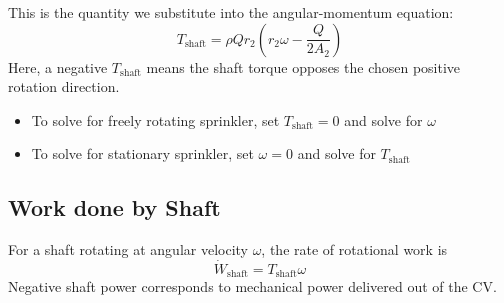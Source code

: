 ﻿\documentclass[12pt]{article}
\begin{document}
\begin{examplebox}
This is the quantity we substitute into the angular-momentum equation:
\[
\boxed{T_{\mathrm{shaft}}=\rho Qr_2\left(r_2\omega-\frac{Q}{2A_2}\right)}
\]
Here, a negative \(T_{\mathrm{shaft}}\) means the shaft torque opposes the chosen positive rotation direction.
\begin{itemize}
    \item To solve for freely rotating sprinkler, set \(T_{\mathrm{shaft}}=0\) and solve for \(\omega\)
    \item To solve for stationary sprinkler, set \(\omega=0\) and solve for \(T_{\mathrm{shaft}}\)
\end{itemize}
\end{examplebox}
\subsection*{Work done by Shaft}
For a shaft rotating at angular velocity \(\omega\), the rate of rotational work is
\[
\boxed{\dot W_{\mathrm{shaft}}=T_{\mathrm{shaft}}\omega}
\]
Negative shaft power corresponds to mechanical power delivered out of the CV.
\end{document}
